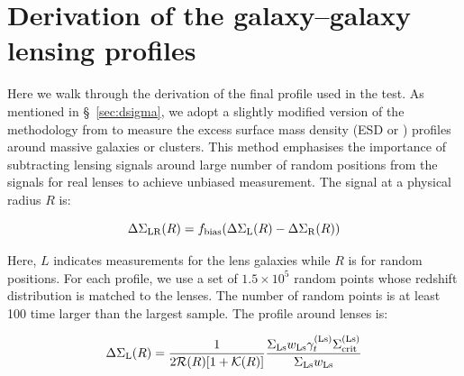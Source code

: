 \documentclass[fleqn,usenatbib,useAMS]{mnras}
\begin{document}




\appendix

\section{Derivation of the galaxy--galaxy lensing profiles}
    \label{app:dsigma_detail}

    Here we walk through the derivation of the final \dsigma{} profile used in the \topn{} test.
    As mentioned in \S\ \ref{sec:dsigma}, we adopt a slightly modified version of the methodology
    from \citet{Singh2017} to measure the excess surface mass density (ESD or \dsigma{}) profiles
    around massive galaxies or clusters.
    This method emphasises the importance of subtracting lensing signals around large number of
    random positions from the signals for real lenses to achieve unbiased measurement.
    The \dsigma{} signal at a physical radius $R$ is:

    \begin{equation}
        {\Delta\Sigma}_{\rm LR}(R) =
        f_{\rm bias}({\Delta\Sigma}_{\mathrm{L}}(R) - {\Delta\Sigma}_{\mathrm{R}}(R))
        \label{eq:ds1}
    \end{equation}

    Here, $L$ indicates measurements for the lens galaxies while $R$ is for random positions.
    For each \dsigma{} profile, we use a set of $1.5 \times 10^5$ random points whose redshift
    distribution is matched to the lenses.
    The number of random points is at least 100 time larger than the largest \topn{} sample.
    The \dsigma{} profile around lenses is:

    \begin{equation}
        {\Delta\Sigma}_{\rm L}(R) = \frac{1}{2 \mathcal{R}(R) [1+\mathcal{K}(R)]}
            \frac{\Sigma_{\rm Ls} w_{\rm Ls} \gamma_{t}^{(\rm Ls)}
            \Sigma_{\rm crit}^{(\rm Ls)}}{\Sigma_{\rm Ls} w_{\rm Ls}}
        \label{eq:ds2}
    \end{equation}
\end{document}
